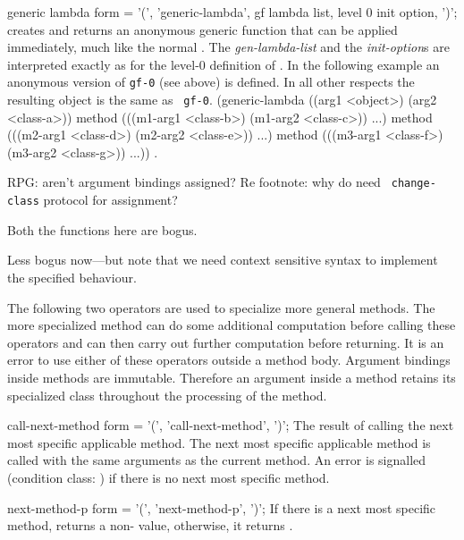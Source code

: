 \begin{optDefinition}
\Syntax
\savesyntax\genericLambdaSyntax\vbox{\syntax
generic lambda form
   = '(', 'generic-lambda', gf lambda list,
     {level 0 init option}, ')';
\endsyntax}
%
\remarks%
 creates and returns an anonymous generic function that
can be applied immediately, much like the normal .  The {\em
    gen-lambda-list} and the {\em init-option\/}s are interpreted exactly as for
the level-0 definition of .  \examples In the following
example an anonymous version of {\tt gf-0} (see  above)
is defined.  In all other respects the resulting object is the same as {\tt
    gf-0}.
%
{\syntax
(generic-lambda ((arg1 <object>) (arg2 <class-a>))
  method (((m1-arg1 <class-b>) (m1-arg2 <class-c>)) ...)
  method (((m2-arg1 <class-d>) (m2-arg2 <class-e>)) ...)
  method (((m3-arg1 <class-f>) (m3-arg2 <class-g>)) ...))
\endsyntax}
%
\seealso%
.
%
\end{optDefinition}

%
\begin{optPrivate}
    RPG: aren't argument bindings assigned?  Re footnote: why do need {\tt
        change-class} protocol for assignment?

    Both the functions here are bogus.

    Less bogus now---but note that we need context sensitive syntax to implement
    the specified behaviour.
\end{optPrivate}
%
\begin{optDefinition}
The following two operators are used to specialize more general methods.  The
more specialized method can do some additional computation before calling these
operators and can then carry out further computation before returning.  It is an
error to use either of these operators outside a method body.  Argument bindings
inside methods are immutable.  Therefore an
argument inside a method retains its specialized class throughout the processing
of the method.

\Syntax
\savesyntax\callNextMethodSyntax\vbox{\syntax
call-next-method form
   = '(', 'call-next-method', ')';
\endsyntax}
%
\result%
The result of calling the next most specific applicable method.
%
\remarks%
The next most specific applicable method is called with the same
arguments as the current method.  An error is signalled (condition
class: ) if there
is no next most specific method.

\Syntax
\savesyntax\nextMethodPSyntax\vbox{\syntax
next-method-p form
   = '(', 'next-method-p', ')';
\endsyntax}
%
\result%
If there is a next most specific method,  returns a
non-\nil\/ value, otherwise, it returns \nil.
%
\end{optDefinition}

